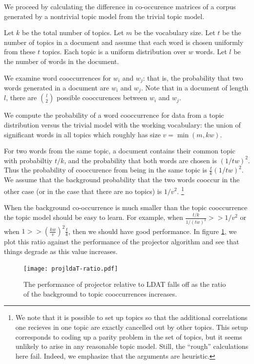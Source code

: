 We proceed by calculating the difference in co-occurence matrices of a
corpus generated by a nontrivial topic model from the trivial topic
model.

Let $k$ be the total number of topics. Let $m$ be the vocabulary size. Let
$t$ be the number of topics in a document and assume that 
each word is chosen uniformly from these $t$ topics. Each topic is a
uniform distribution over $w$ words. 
Let $l$ be the number of words in the document.

We examine word cooccurrences for $w_i$ and $w_j$: that is, the
probability that two words generated in a document are $w_i$ and
$w_j$.  Note that in a document of length $l$, there are ${l \choose
2}$ possible cooccurences between $w_i$ and $w_j$.

We compute the probability of a word cooccurrence for data from a
topic distribution versus  the trivial model with the working
vocabulary: the union of significant words in all topics which roughly has
size $v = \min(m,kw)$.

For two words from the same topic, a document contains their common
topic with probabiltiy $t/k$, and the probability that both words are
chosen is $(1/tw)^2$. Thus the probability of cooccurence from being
in the same topic is $\frac{t}{k} (1/tw)^2$.  We assume that the background
probability that the two words cooccur in the other case (or in the
case that there are no topics) is $1/v^2$.  \footnote{We note that it
is possible to set up topics so that the additional correlations one
recieves in one topic are exactly cancelled out by other topics.  This
setup corresponds to coding up a parity problem in the set of topics,
but it seems unlikely to arise in any reasonable topic model.  Still,
the ``rough'' calculations here fail. Indeed, we emphasize that the
arguments are heuristic.}

When the background co-occurrence is much smaller than the
topic cooccurrence the topic model should be easy to learn.  For
example, when $\frac{t/k}{1/(tw)^2} >> 1/v^2$ or when $1 >>
(\frac{kw}{v})^2 \frac{t}{k}$, then we should have good
performance. In figure \ref{fig:ratio}, we plot this ratio against the
performance of the projector algorithm and see that things degrade as
this value increases.


\begin{figure}
     \begin{center}
                  \texttt{[image: projldaT-ratio.pdf]}
    \end{center}
    \caption{The performance of projector relative to LDAT falls off as the ratio of the background
to topic cooccurrences increases.
}
   \label{fig:ratio}
\end{figure}



